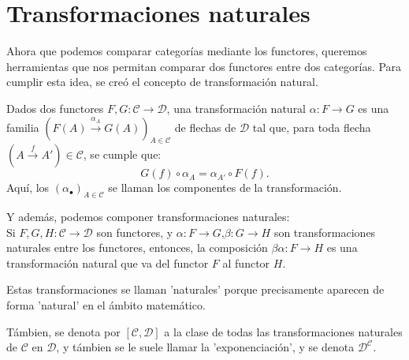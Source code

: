 \section{Transformaciones naturales}
    Ahora que podemos comparar categorías mediante los functores, queremos herramientas que nos permitan comparar dos functores entre dos categorías. Para cumplir esta idea, se creó el concepto de transformación natural.
    \begin{definition}
        Dados dos functores $F,G:\mathcal{C\to D}$, una transformación natural $\alpha:F\to G$ es una familia $(F(A)\overset{\alpha_A}{\to}G(A))_{A\in\mathcal{C}}$ de flechas de $\mathcal{D}$ tal que, para toda flecha $(A\overset{f}{\to}A')\in\mathcal{C}$, se cumple que:
        \begin{equation*}
            G(f)\circ\alpha_A = \alpha_{A'}\circ F(f).
        \end{equation*}
        Aquí, los $(\alpha_\bullet)_{A\in\mathcal{C}}$ se llaman los componentes de la transformación.
    \end{definition}
    Y además, podemos componer transformaciones naturales:\\
    Si $F,G,H:\mathcal{C\to D}$ son functores, y $\alpha:F\to G$,$\beta:G\to H$ son transformaciones naturales entre los functores, entonces, la composición $\beta\alpha:F\to H$ es una transformación natural que va del functor $F$ al functor $H$.
    
    Estas transformaciones se llaman 'naturales' porque precisamente aparecen de forma 'natural' en el ámbito matemático.
    
    Támbien, se denota por $[\mathcal{C,D}]$ a la clase de todas las transformaciones naturales de $\mathcal{C}$ en $\mathcal{D}$, y támbien se le suele llamar la 'exponenciación', y se denota $\mathcal{D^C}$.
    
